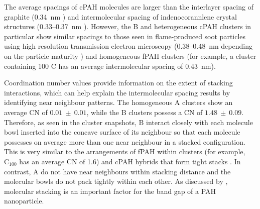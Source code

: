 The average spacings of cPAH molecules are larger than the interlayer spacing of graphite (0.34~nm \cite{franklin1951structure}) and intermolecular spacing of indenocorannlene crystal structures (0.33--0.37~nm \cite{Filatov2010}). However, the B and heterogeneous cPAH clusters in particular show similar spacings to those seen in flame-produced soot particles using high resolution transmission electron microscopy (0.38--0.48~nm depending on the particle maturity \cite{botero2019internal,apicella2015soot}) and homogeneous fPAH clusters (for example, a cluster containing 100 C \cite{chen2014phase} has an average intermolecular spacing of 0.43~nm). 

Coordination number values provide information on the extent of stacking interactions, which can help explain the intermolecular spacing results by identifying near neighbour patterns. The homogeneous A clusters show an average CN of $0.01~\pm~0.01$, while the B clusters possess a CN of $1.48~\pm~0.09$. Therefore, as seen in the cluster snapshots, B interact closely with each molecule bowl inserted into the concave surface of its neighbour so that each molecule possesses on average more than one near neighbour in a stacked configuration. This is very similar to the arrangements of fPAH within clusters (for example, $\text{C}_{\text{100}}$ has an average CN of 1.6) \cite{chen2014size} and cPAH hybrids that form tight stacks \cite{dubceac2018self}. In contrast, A do not have near neighbours within stacking distance and the molecular bowls do not pack tightly within each other. As discussed by \citet{liu2019flame}, molecular stacking is an important factor for the band gap of a PAH nanoparticle.

